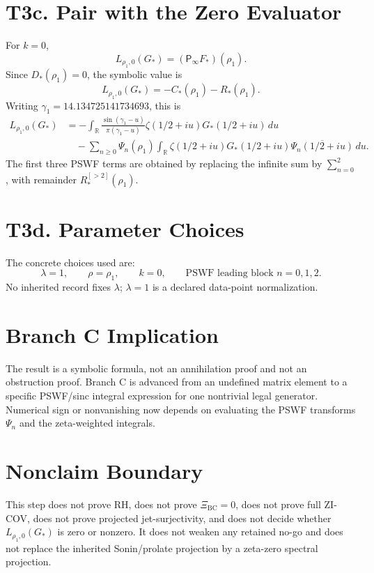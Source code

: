 \documentclass[11pt]{article}
\newcommand{\Psym}{\mathsf P_\infty}
\begin{document}
\section{T3c. Pair with the Zero Evaluator}

For \(k=0\),
\[
L_{\rho_1,0}(G_*)=(\Psym F_*)(\rho_1).
\]
Since \(D_*(\rho_1)=0\), the symbolic value is
\[
\boxed{
L_{\rho_1,0}(G_*)
=
-C_*(\rho_1)-R_*(\rho_1).
}
\]
Writing \(\gamma_1=14.134725141734693\), this is
\[
\boxed{
\begin{aligned}
L_{\rho_1,0}(G_*)
&=
-\int_{\mathbb R}
\frac{\sin(\gamma_1-u)}{\pi(\gamma_1-u)}
\zeta(1/2+iu)G_*(1/2+iu)\,du\\
&\quad
-\sum_{n\ge0}\Psi_n(\rho_1)
\int_{\mathbb R}
\zeta(1/2+iu)G_*(1/2+iu)
\overline{\Psi_n(1/2+iu)}\,du.
\end{aligned}
}
\]
The first three PSWF terms are obtained by replacing the infinite sum by
\(\sum_{n=0}^{2}\), with remainder \(R_*^{[>2]}(\rho_1)\).

\section{T3d. Parameter Choices}

The concrete choices used are:
\[
\lambda=1,\qquad \rho=\rho_1,\qquad k=0,\qquad
\text{PSWF leading block } n=0,1,2.
\]
No inherited record fixes \(\lambda\); \(\lambda=1\) is a declared data-point
normalization.

\section{Branch C Implication}

The result is a symbolic formula, not an annihilation proof and not an
obstruction proof.  Branch C is advanced from an undefined matrix element to a
specific PSWF/sinc integral expression for one nontrivial legal generator.
Numerical sign or nonvanishing now depends on evaluating the PSWF transforms
\(\Psi_n\) and the zeta-weighted integrals.

\section{Nonclaim Boundary}

This step does not prove RH, does not prove \(\Xi_{\mathrm{BC}}=0\), does not
prove full ZI-COV, does not prove projected jet-surjectivity, and does not
decide whether \(L_{\rho_1,0}(G_*)\) is zero or nonzero.  It does not weaken
any retained no-go and does not replace the inherited Sonin/prolate projection
by a zeta-zero spectral projection.
\end{document}
